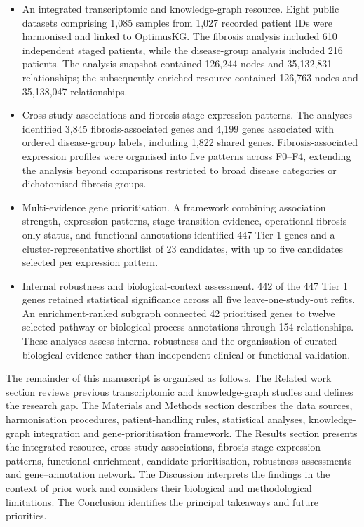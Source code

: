 \documentclass[11pt,a4paper]{article}
\begin{document}
\begin{itemize}
    \item An integrated transcriptomic and knowledge-graph resource. Eight public datasets comprising 1,085 samples from 1,027 recorded patient IDs were harmonised and linked to OptimusKG. The fibrosis analysis included 610 independent staged patients, while the disease-group analysis included 216 patients. The analysis snapshot contained 126,244 nodes and 35,132,831 relationships; the subsequently enriched resource contained 126,763 nodes and 35,138,047 relationships.

    \item Cross-study associations and fibrosis-stage expression patterns. The analyses identified 3,845 fibrosis-associated genes and 4,199 genes associated with ordered disease-group labels, including 1,822 shared genes. Fibrosis-associated expression profiles were organised into five patterns across F0--F4, extending the analysis beyond comparisons restricted to broad disease categories or dichotomised fibrosis groups.

    \item Multi-evidence gene prioritisation. A framework combining association strength, expression patterns, stage-transition evidence, operational fibrosis-only status, and functional annotations identified 447 Tier 1 genes and a cluster-representative shortlist of 23 candidates, with up to five candidates selected per expression pattern.

    \item Internal robustness and biological-context assessment. 442 of the 447 Tier 1 genes retained statistical significance across all five leave-one-study-out refits. An enrichment-ranked subgraph connected 42 prioritised genes to twelve selected pathway or biological-process annotations through 154 relationships. These analyses assess internal robustness and the organisation of curated biological evidence rather than independent clinical or functional validation.
\end{itemize}

The remainder of this manuscript is organised as follows. The Related work section reviews previous transcriptomic and knowledge-graph studies and defines the research gap. The Materials and Methods section describes the data sources, harmonisation procedures, patient-handling rules, statistical analyses, knowledge-graph integration and gene-prioritisation framework. The Results section presents the integrated resource, cross-study associations, fibrosis-stage expression patterns, functional enrichment, candidate prioritisation, robustness assessments and gene--annotation network. The Discussion interprets the findings in the context of prior work and considers their biological and methodological limitations. The Conclusion identifies the principal takeaways and future priorities.
\end{document}
